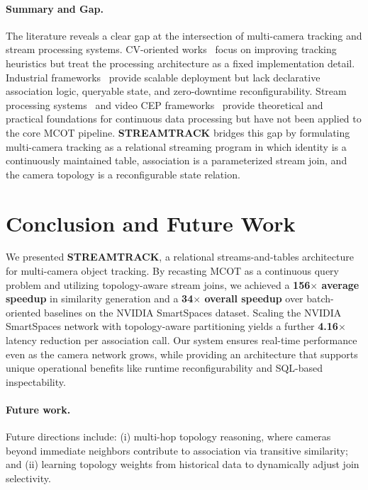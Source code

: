 \documentclass[review]{elsarticle}
\begin{document}
\paragraph{Summary and Gap.}
The literature reveals a clear gap at the intersection of multi-camera tracking and stream processing systems. CV-oriented works~\cite{yoshida2024overlap,kim2024cluster,xie2024robust,specker2024ocmctrack,yang2024online} focus on improving tracking heuristics but treat the processing architecture as a fixed implementation detail. Industrial frameworks~\cite{nvidia2024deepstream,nvidia2025metropolis} provide scalable deployment but lack declarative association logic, queryable state, and zero-downtime reconfigurability. Stream processing systems~\cite{sax2018streams,carbone2015flink,kreps2011kafka} and video CEP frameworks~\cite{yadav2019vidcep} provide theoretical and practical foundations for continuous data processing but have not been applied to the core MCOT pipeline. \textbf{STREAMTRACK} bridges this gap by formulating multi-camera tracking as a relational streaming program in which identity is a continuously maintained table, association is a parameterized stream join, and the camera topology is a reconfigurable state relation.

\section{Conclusion and Future Work}\label{sec:conclusion}
We presented \textbf{STREAMTRACK}, a relational streams-and-tables architecture for multi-camera object tracking. By recasting MCOT as a continuous query problem and utilizing topology-aware stream joins, we achieved a \textbf{156$\times$ average speedup} in similarity generation and a \textbf{34$\times$ overall speedup} over batch-oriented baselines on the NVIDIA SmartSpaces dataset. Scaling the NVIDIA SmartSpaces network with topology-aware partitioning yields a further \textbf{4.16$\times$} latency reduction per association call. Our system ensures real-time performance even as the camera network grows, while providing an architecture that supports unique operational benefits like runtime reconfigurability and SQL-based inspectability.

\paragraph{Future work.}
Future directions include: (i) multi-hop topology reasoning, where cameras beyond immediate neighbors contribute to association via transitive similarity; and (ii) learning topology weights from historical data to dynamically adjust join selectivity.

% 


\end{document}
